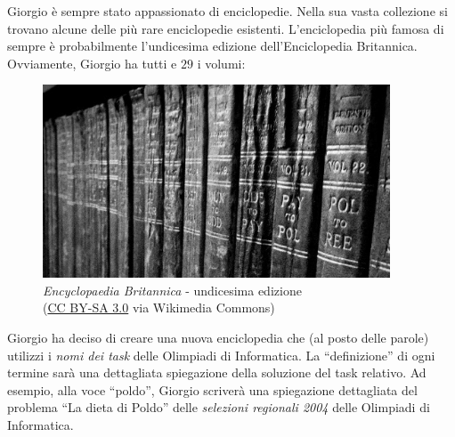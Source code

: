\usepackage{xcolor}
\usepackage{afterpage}
\usepackage{caption}
\usepackage{hyperref}
\usepackage{pifont,mdframed}
\usepackage[bottom]{footmisc}

\makeatletter
\gdef\this@inputfilename{input.txt}
\gdef\this@outputfilename{output.txt}
\makeatother

\newcommand{\inputfile}{\texttt{input.txt}}
\newcommand{\outputfile}{\texttt{output.txt}}

\newenvironment{warning}
  {\par\begin{mdframed}[linewidth=2pt,linecolor=gray]%
    \begin{list}{}{\leftmargin=1cm
                   \labelwidth=\leftmargin}\item[\Large\ding{43}]}
  {\end{list}\end{mdframed}\par}

Giorgio è sempre stato appassionato di enciclopedie. Nella sua vasta collezione si trovano alcune delle più rare enciclopedie esistenti. L'enciclopedia più famosa di sempre è probabilmente l'undicesima edizione dell'Enciclopedia Britannica. Ovviamente, Giorgio ha tutti e $29$ i volumi:

\begin{figure}[h]
  \centering
  \includegraphics[width=0.92\textwidth]{britannica.jpg}
  \caption*{\emph{Encyclopaedia Britannica} - undicesima edizione \\ \scriptsize (\href{http://creativecommons.org/licenses/by-sa/3.0}{CC BY-SA 3.0} via Wikimedia Commons)}
\end{figure}

Giorgio ha deciso di creare una nuova enciclopedia che (al posto delle parole) utilizzi i \emph{nomi dei task} delle Olimpiadi di Informatica. La ``definizione'' di ogni termine sarà una dettagliata spiegazione della soluzione del task relativo. Ad esempio, alla voce ``poldo'', Giorgio scriverà una spiegazione dettagliata del problema ``La dieta di Poldo'' delle \emph{selezioni regionali 2004} delle Olimpiadi di Informatica.


